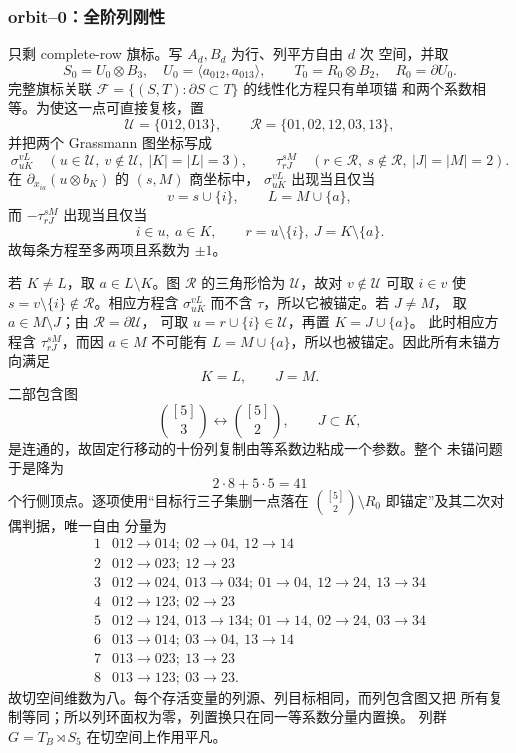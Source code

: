 \subsubsection{orbit--0：全阶列刚性}

只剩 complete-row 旗标。写 \(A_d,B_d\) 为行、列平方自由 \(d\) 次
空间，并取
\[
 S_0=U_0\otimes B_3,\quad
 U_0=\langle a_{012},a_{013}\rangle,\qquad
 T_0=R_0\otimes B_2,\quad R_0=\partial U_0.
\]
完整旗标关联
\(\mathcal F=\{(S,T):\partial S\subset T\}\) 的线性化方程只有单项锚
和两个系数相等。为使这一点可直接复核，置
\[
\mathcal U=\{012,013\},\qquad
\mathcal R=\{01,02,12,03,13\},
\]
并把两个 Grassmann 图坐标写成
\[
\sigma_{uK}^{vL}\quad
(u\in\mathcal U,\ v\notin\mathcal U,\ |K|=|L|=3),
\qquad
\tau_{rJ}^{sM}\quad
(r\in\mathcal R,\ s\notin\mathcal R,\ |J|=|M|=2).
\]
在 \(\partial_{x_{ia}}(u\otimes b_K)\) 的 \((s,M)\) 商坐标中，
\(\sigma_{uK}^{vL}\) 出现当且仅当
\[
v=s\cup\{i\},\qquad L=M\cup\{a\},
\]
而 \(-\tau_{rJ}^{sM}\) 出现当且仅当
\[
i\in u,\ a\in K,\qquad r=u\setminus\{i\},\
J=K\setminus\{a\}.
\]
故每条方程至多两项且系数为 \(\pm1\)。

若 \(K\ne L\)，取 \(a\in L\setminus K\)。图
\(\mathcal R\) 的三角形恰为 \(\mathcal U\)，故对
\(v\notin\mathcal U\) 可取 \(i\in v\) 使
\(s=v\setminus\{i\}\notin\mathcal R\)。相应方程含
\(\sigma_{uK}^{vL}\) 而不含 \(\tau\)，所以它被锚定。若 \(J\ne M\)，
取 \(a\in M\setminus J\)；由 \(\mathcal R=\partial\mathcal U\)，
可取 \(u=r\cup\{i\}\in\mathcal U\)，再置 \(K=J\cup\{a\}\)。
此时相应方程含 \(\tau_{rJ}^{sM}\)，而因 \(a\in M\) 不可能有
\(L=M\cup\{a\}\)，所以也被锚定。因此所有未锚方向满足
\[
K=L,\qquad J=M.
\]
二部包含图
\[
\binom{[5]}3\longleftrightarrow\binom{[5]}2,\qquad J\subset K,
\]
是连通的，故固定行移动的十份列复制由等系数边粘成一个参数。整个
未锚问题于是降为
\[
2\cdot8+5\cdot5=41
\]
个行侧顶点。逐项使用“目标行三子集删一点落在
\(\binom{[5]}2\setminus R_0\) 即锚定”及其二次对偶判据，唯一自由
分量为
\[
\begin{array}{c|l}
1&012\to014;\ 02\to04,\ 12\to14\\
2&012\to023;\ 12\to23\\
3&012\to024,\ 013\to034;\ 01\to04,\ 12\to24,\ 13\to34\\
4&012\to123;\ 02\to23\\
5&012\to124,\ 013\to134;\ 01\to14,\ 02\to24,\ 03\to34\\
6&013\to014;\ 03\to04,\ 13\to14\\
7&013\to023;\ 13\to23\\
8&013\to123;\ 03\to23.
\end{array}
\]
故切空间维数为八。每个存活变量的列源、列目标相同，而列包含图又把
所有复制等同；所以列环面权为零，列置换只在同一等系数分量内置换。
列群 \(G=T_B\rtimes S_5\) 在切空间上作用平凡。

